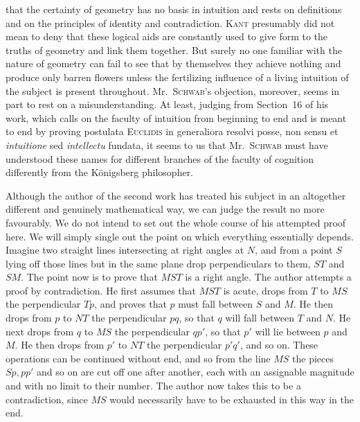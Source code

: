 %
that the certainty of geometry has no basis in intuition and rests on definitions and on the principles of identity and contradiction. \textsc{Kant} presumably did not mean to deny that these logical aids are constantly used to give form to the truths of geometry and link them together. But surely no one familiar with the nature of geometry can fail to see that by themselves they achieve nothing and produce only barren flowers unless the fertilizing influence of a living intuition of the subject is present throughout. Mr.~\textsc{Schwab}'s objection, moreover, seems in part to rest on a misunderstanding. At least, judging from Section~16 of his work, which calls on the faculty of intuition from beginning to end and is meant to end by proving postulata \textsc{Euclidis} in generaliora resolvi posse, non sensu et \textit{intuitione} sed \textit{intellectu} fundata, it seems to us that Mr.~\textsc{Schwab} must have understood these names for different branches of the faculty of cognition differently from the Königsberg philosopher.

Although the author of the second work has treated his subject in an altogether different and genuinely mathematical way, we can judge the result no more favourably. We do not intend to set out the whole course of his attempted proof here. We will simply single out the point on which everything essentially depends. Imagine two straight lines intersecting at right angles at \(N\), and from a point \(S\) lying off those lines but in the same plane drop perpendiculars to them, \(ST\) and \(SM\). The point now is to prove that \(MST\) is a right angle. The author attempts a proof by contradiction. He first assumes that \(MST\) is acute, drops from \(T\) to \(MS\) the perpendicular \(Tp\), and proves that \(p\) must fall between \(S\) and \(M\). He then drops from \(p\) to \(NT\) the perpendicular \(pq\), so that \(q\) will fall between \(T\) and \(N\). He next drops from \(q\) to \(MS\) the perpendicular \(qp'\), so that \(p'\) will lie between \(p\) and \(M\). He then drops from \(p'\) to \(NT\) the perpendicular \(p'q'\), and so on. These operations can be continued without end, and so from the line \(MS\) the pieces \(Sp,pp'\) and so on are cut off one after another, each with an assignable magnitude and with no limit to their number. The author now takes this to be a contradiction, since \(MS\) would necessarily have to be exhausted in this way in the end.
